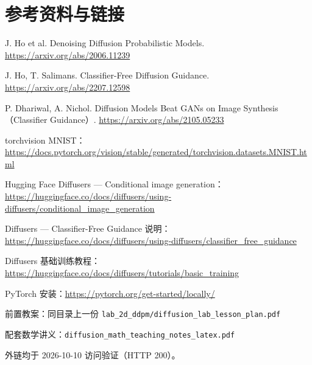 \documentclass[a4paper,fontset=none,zihao=5]{ctexart}
\newcommand{\code}[1]{\texttt{#1}}
\begin{document}
\section{参考资料与链接}
\small
\begin{enumerate}[label={[\arabic*]},leftmargin=2.2em,itemsep=2pt]
  \item J. Ho et al. Denoising Diffusion Probabilistic Models. \url{https://arxiv.org/abs/2006.11239}
  \item J. Ho, T. Salimans. Classifier-Free Diffusion Guidance. \url{https://arxiv.org/abs/2207.12598}
  \item P. Dhariwal, A. Nichol. Diffusion Models Beat GANs on Image Synthesis（Classifier Guidance）. \url{https://arxiv.org/abs/2105.05233}
  \item torchvision MNIST：\url{https://docs.pytorch.org/vision/stable/generated/torchvision.datasets.MNIST.html}
  \item Hugging Face Diffusers — Conditional image generation：\url{https://huggingface.co/docs/diffusers/using-diffusers/conditional_image_generation}
  \item Diffusers — Classifier-Free Guidance 说明：\url{https://huggingface.co/docs/diffusers/using-diffusers/classifier_free_guidance}
  \item Diffusers 基础训练教程：\url{https://huggingface.co/docs/diffusers/tutorials/basic_training}
  \item PyTorch 安装：\url{https://pytorch.org/get-started/locally/}
  \item 前置教案：同目录上一份 \code{lab\_2d\_ddpm/diffusion\_lab\_lesson\_plan.pdf}
  \item 配套数学讲义：\code{diffusion\_math\_teaching\_notes\_latex.pdf}
\end{enumerate}
{\footnotesize\color{cmuted} 外链均于 2026-10-10 访问验证（HTTP 200）。}
\end{document}
